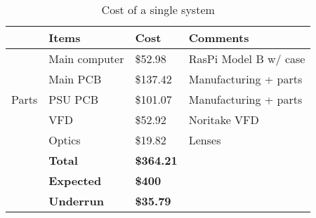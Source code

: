 \begin{table}
\centering
\begin{tabular}{|l|l|l|l|}
\hline
 & Items & Cost & Comments \\ \hline
\multirow{5}{*}{Parts}
 & Main computer & \$52.98  & RasPi Model B w/ case \\
 & Main PCB      & \$137.42 & Manufacturing + parts \\
 & PSU PCB       & \$101.07 & Manufacturing + parts \\
 & VFD           & \$52.92  & Noritake VFD \\
 & Optics        & \$19.82  & Lenses \\ \hline
& \textbf{Total}    & \textbf{\$364.21 } & \\ \hline
& \textbf{Expected} & \textbf{\$400 } & \\ \hline
& \textbf{Underrun} &  \textbf{\$35.79 } & \\ \hline
\end{tabular}
\caption{Cost of a single system}
\label{tab:product}
\end{table}
